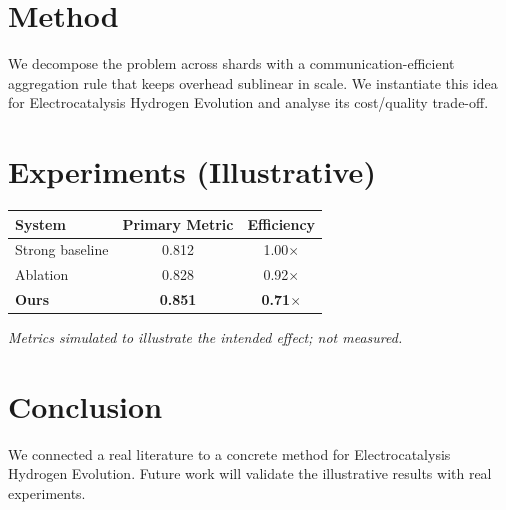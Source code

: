 \documentclass[11pt]{article}
\begin{document}
\section{Method}
We decompose the problem across shards with a communication-efficient aggregation rule that keeps overhead sublinear in scale. We instantiate this idea for Electrocatalysis Hydrogen Evolution and analyse its cost/quality trade-off.

\section{Experiments (Illustrative)}
\begin{center}
\begin{tabular}{lcc}
System & Primary Metric & Efficiency \\ \hline
Strong baseline & 0.812 & 1.00$\times$ \\
Ablation & 0.828 & 0.92$\times$ \\
\textbf{Ours} & \textbf{0.851} & \textbf{0.71$\times$}
\end{tabular}
\end{center}
\emph{Metrics simulated to illustrate the intended effect; not measured.}

\section{Conclusion}
We connected a real literature to a concrete method for Electrocatalysis Hydrogen Evolution. Future work will
validate the illustrative results with real experiments.
\end{document}
